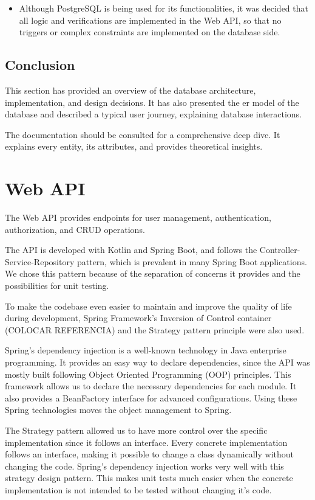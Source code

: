 \begin{itemize}
    \item Although PostgreSQL is being used for its functionalities, it was decided that all logic and verifications are implemented in the Web API, so that no triggers or complex constraints are implemented on the database side.
\end{itemize}

\subsection{Conclusion}
This section has provided an overview of the database architecture, implementation, and design decisions. It has also presented the \acs{er model} of the database and described a typical user journey, explaining database interactions.

The documentation should be consulted for a comprehensive deep dive. It explains every entity, its attributes, and provides theoretical insights.

\section{Web API}
The Web API provides endpoints for user management, authentication, authorization, and CRUD operations. 

The API is developed with Kotlin and Spring Boot, and follows the Controller-Service-Repository pattern, which is prevalent in many Spring Boot applications. We chose this pattern because of the separation of concerns it provides and the possibilities for unit testing.

To make the codebase even easier to maintain and improve the quality of life during development, Spring Framework's Inversion of Control container (COLOCAR REFERENCIA) and the Strategy pattern principle were also used. 

Spring's dependency injection is a well-known technology in Java enterprise programming. It provides an easy way to declare dependencies, since the API was mostly built following Object Oriented Programming (OOP) principles. This framework allows us to declare the necessary dependencies for each module. It also provides a BeanFactory interface for advanced configurations. Using these Spring technologies moves the object management to Spring.

The Strategy pattern allowed us to have more control over the specific implementation since it follows an interface. Every concrete implementation follows an interface, making it possible to change a class dynamically without changing the code. Spring's dependency injection works very well with this strategy design pattern. This makes unit tests much easier when the concrete implementation is not intended to be tested without changing it's code.

